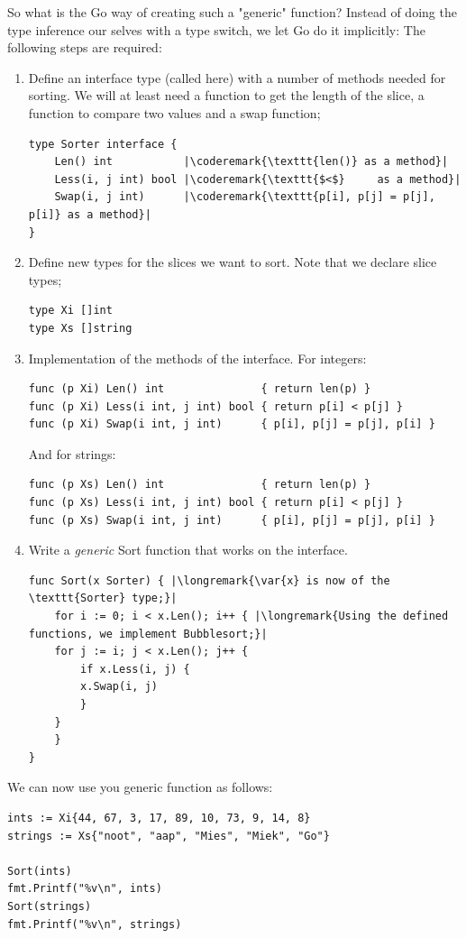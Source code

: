 So what is the Go way of creating such a "generic" function? 
Instead of doing the type inference our selves with a type switch, we let
Go do it implicitly:
The following steps are required:
\begin{enumerate}
\item Define an interface type (called  here) with a number of 
methods needed for sorting.
We will at least need a function to get the length of the slice,
a function to compare two values and a swap function;
\begin{lstlisting}
type Sorter interface {
    Len() int           |\coderemark{\texttt{len()} as a method}|
    Less(i, j int) bool |\coderemark{\texttt{$<$}     as a method}|
    Swap(i, j int)      |\coderemark{\texttt{p[i], p[j] = p[j], p[i]} as a method}|
}
\end{lstlisting}
\item Define new types for the slices we want to sort. Note that we
declare slice types;
\begin{lstlisting}
type Xi []int
type Xs []string
\end{lstlisting}
\item Implementation of the methods of the  interface.
For integers:
\begin{lstlisting}
func (p Xi) Len() int               { return len(p) }
func (p Xi) Less(i int, j int) bool { return p[i] < p[j] }
func (p Xi) Swap(i int, j int)      { p[i], p[j] = p[j], p[i] }
\end{lstlisting}
And for strings:
\begin{lstlisting}
func (p Xs) Len() int               { return len(p) }
func (p Xs) Less(i int, j int) bool { return p[i] < p[j] }
func (p Xs) Swap(i int, j int)      { p[i], p[j] = p[j], p[i] }
\end{lstlisting}
\item Write a \emph{generic} Sort function that works on the  interface.
\begin{lstlisting}
func Sort(x Sorter) { |\longremark{\var{x} is now of the \texttt{Sorter} type;}|
    for i := 0; i < x.Len(); i++ { |\longremark{Using the defined functions, we implement Bubblesort;}|
	for j := i; j < x.Len(); j++ {
	    if x.Less(i, j) {
		x.Swap(i, j)
	    }
	}
    }
}
\end{lstlisting}
\showremarks
\end{enumerate}
We can now use you generic  function as follows:
\begin{lstlisting}
ints := Xi{44, 67, 3, 17, 89, 10, 73, 9, 14, 8}
strings := Xs{"noot", "aap", "Mies", "Miek", "Go"}

Sort(ints)
fmt.Printf("%v\n", ints)
Sort(strings)
fmt.Printf("%v\n", strings)
\end{lstlisting}

